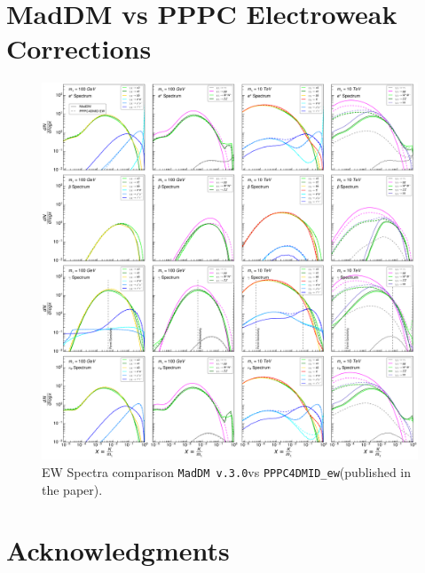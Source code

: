 \documentclass[a4paper,11pt]{article}
\newcommand{\PPPCew}{\texttt{PPPC4DMID\_ew}}
\newcommand{\MADDM}{\texttt{MadDM v.3.0}}
\begin{document}
\section{MadDM vs PPPC Electroweak Corrections}

\begin{figure}[!]
\begin{center}
\includegraphics[width=1\textwidth]{Fig/EW_Grid_Plots.pdf}
\end{center}
\caption{EW Spectra comparison \MADDM vs \PPPCew (published in the paper).}
\end{figure}





\section*{Acknowledgments}







\end{document}
